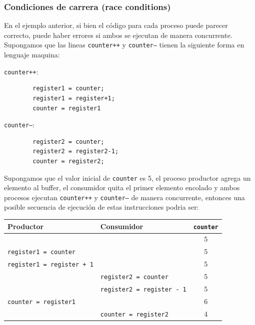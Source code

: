 \subsubsection{Condiciones de carrera (race conditions)}
En el ejemplo anterior, si bien el código para cada proceso puede parecer correcto, puede haber errores si ambos se ejecutan de manera concurrente. Supongamos que las lineas \texttt{counter++} y \texttt{counter--} tienen la siguiente forma en lenguaje maquina:
\begin{center}
    \begin{minipage}{0.8\textwidth}
\begin{multicols}{2}
    \noindent\texttt{counter++}:
    \begin{verbatim}
        register1 = counter;
        register1 = register+1;
        counter = register1	
    \end{verbatim}
    
    \noindent\texttt{counter--}:
    \begin{verbatim}
        register2 = counter;
        register2 = register2-1;
        counter = register2;
    \end{verbatim}
\end{multicols}
\end{minipage}

\end{center}

Supongamos que el valor inicial de \texttt{counter} es 5, el proceso productor agrega un elemento al buffer, el consumidor quita el primer elemento encolado y ambos procesos ejecutan \texttt{counter++} y \texttt{counter--} de manera concurrente, entonces una posible secuencia de ejecución de estas instrucciones podria ser:

\begin{center}
\begin{tabularx}{0.8\textwidth}{|L{1.3}|L{1.3}|C{0.4}|}
    \hline 
    \textbf{Productor} & \textbf{Consumidor} & \textbf{\texttt{counter}} \\
    \hline
    & & 5 \\
    \hline
    \texttt{register1 = counter} & & 5 \\
    \hline
    \texttt{register1 = register + 1} &  & 5 \\
    \hline
     & \texttt{register2 = counter}  & 5 \\
     \hline
     &  \texttt{register2 = register - 1} & 5 \\
      \hline
     \texttt{counter = register1} &  & 6 \\
       \hline
    & \texttt{counter = register2} & 4 \\
    \hline
    \end{tabularx}
\end{center}


